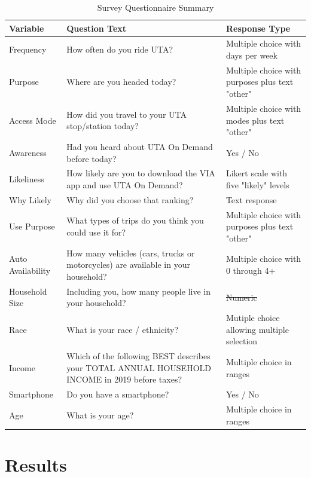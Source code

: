 \documentclass[smartcities,article,submit,moreauthors,pdftex]{Definitions/mdpi}
\providecommand{\DIFadd}[1]{{\protect\color{blue}\uwave{#1}}} %
\providecommand{\DIFdel}[1]{{\protect\color{red}\sout{#1}}}                      %
\providecommand{\DIFaddFL}[1]{\DIFadd{#1}} %
\providecommand{\DIFdelFL}[1]{\DIFdel{#1}} %
\providecommand{\DIFaddbeginFL}{} %
\providecommand{\DIFaddendFL}{} %
\providecommand{\DIFdelbeginFL}{} %
\providecommand{\DIFdelendFL}{} %
\begin{document}
\begin{table}[ht]
\renewcommand{\arraystretch}{1.5}
    \centering
    \caption{Survey Questionnaire Summary}
    \label{tab:survey-summary}
\begin{tabular}[t]{lp{}p{}}
\toprule
Variable & Question Text & Response Type\\
\midrule
Frequency & How often do you ride UTA? & Multiple choice with days per week\\
Purpose & Where are you headed today? & Multiple choice with purposes plus text "other"\\
Access Mode & How did you travel to your UTA stop/station today? & Multiple choice with modes plus text "other"\\
Awareness & Had you heard about UTA On Demand before today? & Yes / No\\
Likeliness & How likely are you to download the VIA app and use UTA On Demand? & Likert scale with five "likely" levels\\
\addlinespace
 Why Likely & Why did you choose that ranking? & Text response\\
Use Purpose & What types of trips do you think you could use it for? & Multiple choice with purposes plus text "other"\\
Auto Availability & How many vehicles (cars, trucks or motorcycles) are available in your household? & Multiple choice with 0 through 4+\\
Household Size & Including you, how many people live in your household? & \DIFdelbeginFL \DIFdelFL{Numeric                                           }\DIFdelendFL \DIFaddbeginFL \DIFaddFL{Multiple choice with 0 through 4+}\DIFaddendFL \\
Race & What is your race / ethnicity? & Mutiple choice allowing multiple selection\\
\addlinespace
Income & Which of the following BEST describes your TOTAL ANNUAL HOUSEHOLD INCOME in 2019 before taxes? & Multiple choice in ranges\\
Smartphone & Do you have a smartphone? & Yes / No\\
Age & What is your age? & Multiple choice in ranges\\
\bottomrule
\end{tabular}
\end{table}

\section{Results}
\end{document}
